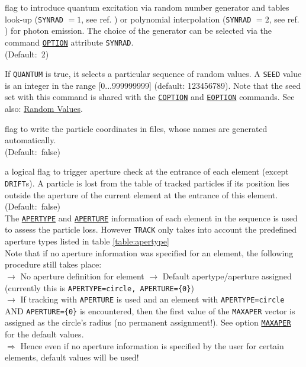 \begin{madlist}
   flag to introduce quantum excitation via random
  number generator and tables look-up (\texttt{SYNRAD} $=1$, see ref. \cite{roy1990}) or polynomial
  interpolation (\texttt{SYNRAD} $=2$, see ref. \cite{hbu2007}) for photon emission.
  The choice of the generator can be selected via the command
  \hyperref[sec:option]{\texttt{OPTION}} attribute \texttt{SYNRAD}. \\ (Default:~2)

   If \texttt{QUANTUM} is true, it selects a particular sequence of random values. 
A \texttt{SEED} value is an integer in the range [0...999999999] (default:
123456789). Note that the seed set with this command is shared with the \hyperref[sec:coption]{\texttt{COPTION}} and \hyperref[sec:coption]{\texttt{EOPTION}} commands. See also: \hyperref[subsubsec:random]{Random Values}.

   flag to write the particle coordinates in files, whose
  names are generated automatically. \\ (Default:~false)

   a logical flag to trigger aperture check at the entrance 
  of each element (except \texttt{DRIFT}s). A particle is lost from the table of 
  tracked particles if its position lies outside the aperture of the current 
  element at the entrance of this element. \\ 
  (Default:~false) \\
  
  The \hyperref[chap:aperture]{\texttt{APERTYPE}} and 
  \hyperref[chap:aperture]{\texttt{APERTURE}} information of each element 
  in the sequence is used to assess the particle loss. 
  However \texttt{TRACK} only takes into account the predefined aperture 
  types listed in table \ref{table:apertype}
  \\
  
  Note that if no aperture information was specified for an element, 
  the following procedure still takes place:
  \\
  $\rightarrow$ No aperture definition for element $\rightarrow$ 
  Default apertype/aperture assigned (currently this is   
  \texttt{APERTYPE=circle, APERTURE=\{0\}}) 
  \\ $\rightarrow$  
  If tracking with \texttt{APERTURE} is used and an
  element with \texttt{APERTYPE=circle} AND \texttt{APERTURE=\{0\}}  
  is encountered, then the first value of the \texttt{MAXAPER} vector
  is assigned as the circle's radius (no permanent assignment!). 
  See option \hyperref[sec:run]{\texttt{MAXAPER}} for the default values. 
  \\ $\Rightarrow$
  Hence even if no aperture information is specified by the user for
  certain elements, default values will be used! 



\end{madlist}

